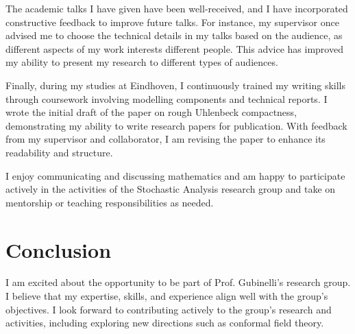\documentclass[12pt]{article}
\numberwithin{equation}{section}
\theoremstyle{definition}
\theoremstyle{remark}
\newcommand{\1}{\mathbf 1}
\newcommand{\<}{\langle}
\renewcommand{\>}{\rangle}
\begin{document}
The academic talks I have given have been well-received, and I have incorporated constructive feedback to improve future talks. For instance, my supervisor once advised me to choose the technical details in my talks based on the audience, as different aspects of my work interests different people. This advice has improved my ability to present my research to different types of audiences. 

Finally, during my studies at Eindhoven, I continuously trained my writing skills through coursework involving modelling components and technical reports.  I wrote the initial draft of the paper on rough Uhlenbeck compactness, demonstrating my ability to write research papers for publication. With feedback from my supervisor and collaborator, I am revising the paper to enhance its readability and structure.

I enjoy communicating and discussing mathematics and am happy to participate actively in the activities of the Stochastic Analysis research group and take on mentorship or teaching responsibilities as needed.


\section{Conclusion}
I am excited about the opportunity to be part of Prof. Gubinelli's research group. I believe that my expertise, skills, and experience align well with the group's objectives. I look forward to contributing actively to the group’s research and activities, including exploring new directions such as conformal field theory.
\end{document}
